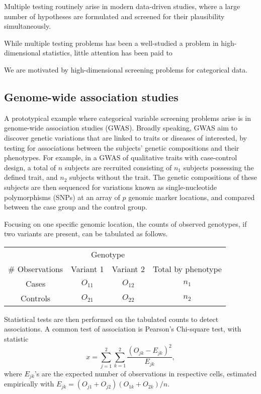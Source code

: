 

Multiple testing routinely arise in modern data-driven studies, where a large number of hypotheses are formulated and screened for their plausibility simultaneously.

While multiple testing problems has been a well-studied a problem in high-dimensional statistics, little attention has been paid to 

We are motivated by high-dimensional screening problems for categorical data.

\subsection{Genome-wide association studies}
\label{subsec:motivation-chisq}

A prototypical example where categorical variable screening problems arise is in genome-wide association studies (GWAS).
Broadly speaking, GWAS aim to discover genetic variations that are linked to traits or diseases of interested, by testing for associations between the subjects' genetic compositions and their phenotypes.
For example, in a GWAS of qualitative traits with case-control design, a total of $n$ subjects are recruited consisting of $n_1$ subjects possessing the defined trait, and $n_2$ subjects without the trait.
The genetic compositions of these subjects are then sequenced for variations known as single-nucleotide polymorphisms (SNPs) at an array of $p$ genomic marker locations, and compared between the case group and the control group.

Focusing on one specific genomic location, the counts of observed genotypes, if two variants are present, can be tabulated as follows.
\begin{center}
    \begin{tabular}{cccc}
    \hline
    & \multicolumn{2}{c}{Genotype} & \\
    \cline{2-3}
    \# Observations & Variant 1 & Variant 2 & Total by phenotype \\
    \hline
    Cases & $O_{11}$ & $O_{12}$ & $n_1$ \\
    Controls & $O_{21}$ & $O_{22}$ & $n_2$ \\
    \hline
    \end{tabular}
\end{center}
Statistical tests are then performed on the tabulated counts to detect associations.
A common test of association is Pearson's Chi-square test, with statistic
\begin{equation} \label{eq:chisq-statistic}
    x = \sum_{j=1}^2 \sum_{k=1}^2 \frac{(O_{jk} - E_{jk})^2}{E_{jk}},
\end{equation}
where $E_{jk}$'s are the expected number of observations in respective cells, estimated empirically with $E_{jk} = (O_{j1}+O_{j2})(O_{1k}+O_{2k})/n$.

